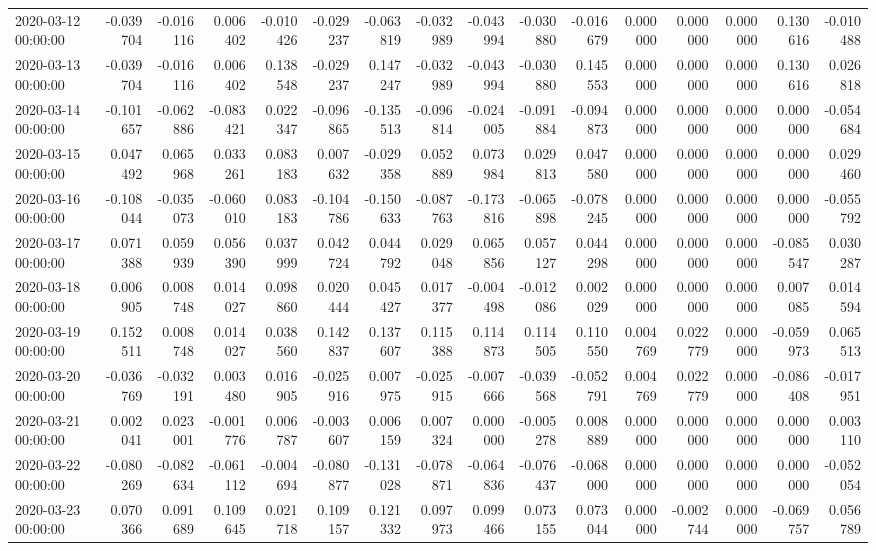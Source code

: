 \begin{tabular}{lrrrrrrrrrrrrrrr}
2020-03-12 00:00:00 & -0.039704 & -0.016116 & 0.006402 & -0.010426 & -0.029237 & -0.063819 & -0.032989 & -0.043994 & -0.030880 & -0.016679 & 0.000000 & 0.000000 & 0.000000 & 0.130616 & -0.010488 \\
2020-03-13 00:00:00 & -0.039704 & -0.016116 & 0.006402 & 0.138548 & -0.029237 & 0.147247 & -0.032989 & -0.043994 & -0.030880 & 0.145553 & 0.000000 & 0.000000 & 0.000000 & 0.130616 & 0.026818 \\
2020-03-14 00:00:00 & -0.101657 & -0.062886 & -0.083421 & 0.022347 & -0.096865 & -0.135513 & -0.096814 & -0.024005 & -0.091884 & -0.094873 & 0.000000 & 0.000000 & 0.000000 & 0.000000 & -0.054684 \\
2020-03-15 00:00:00 & 0.047492 & 0.065968 & 0.033261 & 0.083183 & 0.007632 & -0.029358 & 0.052889 & 0.073984 & 0.029813 & 0.047580 & 0.000000 & 0.000000 & 0.000000 & 0.000000 & 0.029460 \\
2020-03-16 00:00:00 & -0.108044 & -0.035073 & -0.060010 & 0.083183 & -0.104786 & -0.150633 & -0.087763 & -0.173816 & -0.065898 & -0.078245 & 0.000000 & 0.000000 & 0.000000 & 0.000000 & -0.055792 \\
2020-03-17 00:00:00 & 0.071388 & 0.059939 & 0.056390 & 0.037999 & 0.042724 & 0.044792 & 0.029048 & 0.065856 & 0.057127 & 0.044298 & 0.000000 & 0.000000 & 0.000000 & -0.085547 & 0.030287 \\
2020-03-18 00:00:00 & 0.006905 & 0.008748 & 0.014027 & 0.098860 & 0.020444 & 0.045427 & 0.017377 & -0.004498 & -0.012086 & 0.002029 & 0.000000 & 0.000000 & 0.000000 & 0.007085 & 0.014594 \\
2020-03-19 00:00:00 & 0.152511 & 0.008748 & 0.014027 & 0.038560 & 0.142837 & 0.137607 & 0.115388 & 0.114873 & 0.114505 & 0.110550 & 0.004769 & 0.022779 & 0.000000 & -0.059973 & 0.065513 \\
2020-03-20 00:00:00 & -0.036769 & -0.032191 & 0.003480 & 0.016905 & -0.025916 & 0.007975 & -0.025915 & -0.007666 & -0.039568 & -0.052791 & 0.004769 & 0.022779 & 0.000000 & -0.086408 & -0.017951 \\
2020-03-21 00:00:00 & 0.002041 & 0.023001 & -0.001776 & 0.006787 & -0.003607 & 0.006159 & 0.007324 & 0.000000 & -0.005278 & 0.008889 & 0.000000 & 0.000000 & 0.000000 & 0.000000 & 0.003110 \\
2020-03-22 00:00:00 & -0.080269 & -0.082634 & -0.061112 & -0.004694 & -0.080877 & -0.131028 & -0.078871 & -0.064836 & -0.076437 & -0.068000 & 0.000000 & 0.000000 & 0.000000 & 0.000000 & -0.052054 \\
2020-03-23 00:00:00 & 0.070366 & 0.091689 & 0.109645 & 0.021718 & 0.109157 & 0.121332 & 0.097973 & 0.099466 & 0.073155 & 0.073044 & 0.000000 & -0.002744 & 0.000000 & -0.069757 & 0.056789 \\

\end{tabular}

